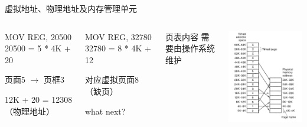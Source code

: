 \documentclass[xcolor=svgnames]{beamer}
\begin{document}
\begin{CJK*}{UTF8}{gbsn}
\begin{frame}{虚拟地址、物理地址及内存管理单元}
\begin{columns}%
\begin{block}{MOV REG, 20500}
20500 = 5 * 4K + 20 

页面5 $\rightarrow$ 页框3

12K + 20 = 12308（物理地址）
\end{block}
\begin{block}{MOV REG, 32780}
32780 = 8 * 4K + 12

对应虚拟页面8（缺页）

\alert{what next?}
\end{block}
\begin{block}{页表内容}
需要由操作系统维护
\end{block}
\includegraphics[width=1.0\textwidth]{vm.png}
\end{columns}%
\end{frame}


\end{CJK*}
\end{document}
